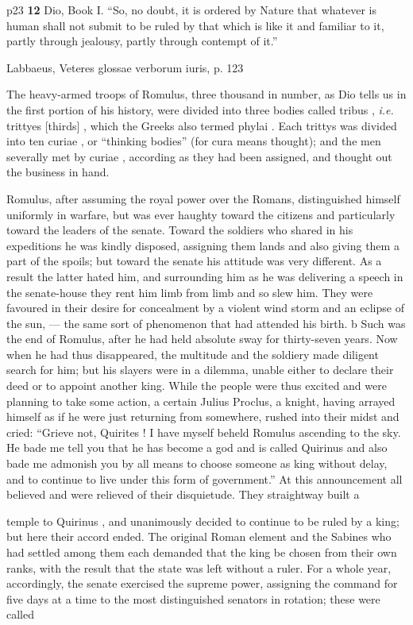 p23
\textbf{12}
Dio, Book I. ``So, no doubt, it is ordered by Nature that whatever is human shall not submit to be ruled by that which is like it and familiar to it, partly through jealousy, partly through contempt of it.''

Labbaeus, Veteres glossae verborum iuris, p. 123

The heavy-armed troops of Romulus, three thousand in number, as Dio tells us in the first portion of his history, were divided into three bodies called tribus , \emph{i.e.} trittyes [thirds] , which the Greeks also termed phylai . Each trittys was divided into ten curiae , or ``thinking bodies'' (for cura means thought); and the men severally met by curiae , according as they had been assigned, and thought out the business in hand.

Romulus, after assuming the royal power over the Romans, distinguished himself uniformly in warfare, but was ever haughty toward the citizens and particularly toward the leaders of the senate. Toward the soldiers who shared in his expeditions he was kindly disposed, assigning them lands and also giving them a part of the spoils; but toward the senate his attitude was very different. As a result the latter hated him, and surrounding him as he was delivering a speech in the senate-house they rent him limb from limb and so slew him. They were favoured in their desire for concealment by a violent wind storm and an eclipse of the sun, \texthebrew{—} the same sort of phenomenon that had attended his birth.\texthebrew{⁠} b Such was the end of Romulus, after he had held absolute sway for thirty-seven years. Now when he had thus disappeared, the multitude and the soldiery made diligent search for him; but his slayers were in a dilemma, unable either to declare their deed or to appoint another king. While the people were thus excited and were planning to take some action, a certain Julius Proclus, a knight, having arrayed himself as if he were just returning from somewhere, rushed into their midst and cried: ``Grieve not, Quirites ! I have myself beheld Romulus ascending to the sky. He bade me tell you that he has become a god and is called Quirinus and also bade me admonish you by all means to choose someone as king without delay, and to continue to live under this form of government.'' At this announcement all believed and were relieved of their disquietude. They straightway built a

temple to Quirinus , and unanimously decided to continue to be ruled by a king; but here their accord ended. The original Roman element and the Sabines who had settled among them each demanded that the king be chosen from their own ranks, with the result that the state was left without a ruler. For a whole year, accordingly, the senate exercised the supreme power, assigning the command for five days at a time to the most distinguished senators in rotation; these were called

